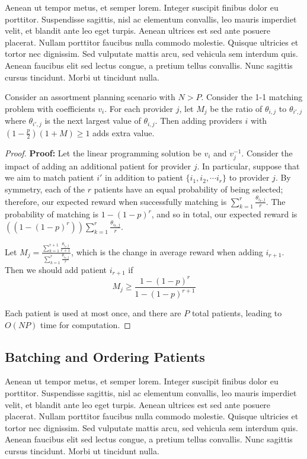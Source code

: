  Aenean ut tempor metus, et semper lorem. Integer suscipit finibus dolor eu porttitor. Suspendisse sagittis, nisl ac elementum convallis, leo mauris imperdiet velit, et blandit ante leo eget turpis. Aenean ultrices est sed ante posuere placerat. Nullam porttitor faucibus nulla commodo molestie. Quisque ultricies et tortor nec dignissim. Sed vulputate mattis arcu, sed vehicula sem interdum quis. Aenean faucibus elit sed lectus congue, a pretium tellus convallis. Nunc sagittis cursus tincidunt. Morbi ut tincidunt nulla.

\begin{lemma}
    Consider an assortment planning scenario with $N > P$. 
    Consider the 1-1 matching problem with coefficients $v_{i}$. 
    For each provider $j$, let $M_{j}$ be the ratio of $\theta_{i,j}$ to $\theta_{i',j}$ where $\theta_{i',j}$ is the next largest value of $\theta_{i,j}$. 
    Then adding providers $i$ with $(1-\frac{p}{2})(1+M) \geq 1$ adds extra value. 
\end{lemma}
\begin{proof}
    \textbf{Proof:} Let the linear programming solution be $v_{i}$ and $v^{-1}_{j}$. 
    Consider the impact of adding an additional patient for provider $j$. 
    In particular, suppose that we aim to match patient $i'$ in addition to patient $\{i_{1}, i_{2}, \cdots i_{r}\}$ to provider $j$. 
    By symmetry, each of the $r$ patients have an equal probability of being selected; therefore, our expected reward when successfully matching is $\sum_{k=1}^{r} \frac{\theta_{i_{k},j}}{r}$. 
    The probability of matching is $1-(1-p)^{r}$, and so in total, our expected reward is $((1-(1-p)^{r})) \sum_{k=1}^{r} \frac{\theta_{i_{k},j}}{r}$. 

    Let $M_{j} = \frac{\sum_{k=1}^{r+1} \frac{\theta_{i_{k},j}}{r+1}}{\sum_{k=1}^{r} \frac{\theta_{i_{k},j}}{r}}$, which is the change in average reward when adding $i_{r+1}$. 
    Then we should add patient $i_{r+1}$ if 
    \begin{equation}
        M_{j} \geq \frac{1-(1-p)^{r}}{1-(1-p)^{r+1}}
    \end{equation}

    Each patient is used at most once, and there are $P$ total patients, leading to $O(NP)$ time for computation. 
\end{proof}

\subsection{Batching and Ordering Patients}
 Aenean ut tempor metus, et semper lorem. Integer suscipit finibus dolor eu porttitor. Suspendisse sagittis, nisl ac elementum convallis, leo mauris imperdiet velit, et blandit ante leo eget turpis. Aenean ultrices est sed ante posuere placerat. Nullam porttitor faucibus nulla commodo molestie. Quisque ultricies et tortor nec dignissim. Sed vulputate mattis arcu, sed vehicula sem interdum quis. Aenean faucibus elit sed lectus congue, a pretium tellus convallis. Nunc sagittis cursus tincidunt. Morbi ut tincidunt nulla.

